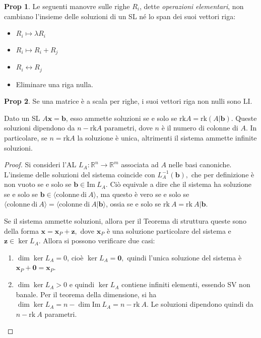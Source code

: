 \documentclass[]{article}
\newcommand{\bl}[1]{\mathbf{#1}}
\newcommand{\vb}{\mathbf{b}}
\theoremstyle{definition}
\theoremstyle{definition}
\newtheorem{prop}{Prop}[subsection]
\theoremstyle{definition}
\begin{document}
\begin{prop} Le seguenti manovre sulle righe $R_i$, dette \emph{operazioni elementari}, non cambiano l'insieme delle soluzioni di un SL né lo span dei suoi vettori riga:
\begin{itemize}
	\item $R_i \mapsto \lambda R_i $
	\item  $R_i \mapsto R_i + R_j $
	\item  $R_i \leftrightarrow R_j $
	\item  Eliminare una riga nulla.
\end{itemize}

\end{prop} \begin{prop} Se una matrice è a scala per righe, i suoi vettori riga non nulli sono LI.

\end{prop} 
\begin{thm} 
 Dato un SL $A \bl{x}= \bl{b}$, esso ammette soluzioni se e solo se $\mathrm{rk}A=\mathrm{rk}(A|\bl{b})$. Queste soluzioni dipendono da $n-\mathrm{rk}A$ parametri, dove $n$ è il numero di colonne di $A$. In particolare, se $n= \mathrm{rk} A$ la soluzione è unica, altrimenti il sistema ammette infinite soluzioni.
\end{thm}
\begin{proof}
Si consideri l'AL $L_A:\mathbb{R}^n \to \mathbb{R}^m$ associata ad $A$ nelle basi canoniche. L'insieme delle soluzioni del sistema coincide con $L_A^{-1}(\vb),$ che per definizione è non vuoto se e solo se $\vb \in \mathrm{Im}\ L_A.$ Ciò equivale a dire che il sistema ha soluzione se e solo se $\vb \in \langle \mathrm{colonne\ di\ } A \rangle$, ma questo è vero se e solo se $\langle \mathrm{colonne\ di\ } A \rangle= \langle \mathrm{colonne\ di\ } A|\vb \rangle$, ossia se e solo se $\mathrm{rk}\ A = \mathrm{rk}\ A|\vb.$

Se il sistema ammette soluzioni, allora per il Teorema di struttura queste sono della forma $\bl{x}=\bl{x}_P + \bl{z},$ dove $\bl{x}_P$ è una soluzione particolare del sistema e $\bl{z} \in \ker L_A.$ Allora si possono verificare due casi:
\begin{enumerate}
\item $\dim \ker L_A=0$, cioè $\ker L_A = \bl{0},$ quindi l'unica soluzione del sistema è $\bl{x}_P+\bl{0}=\bl{x}_P$.
\item $\dim \ker L_A>0$ e quindi $\ker L_A$ contiene infiniti elementi, essendo SV non banale. Per il teorema della dimensione, si ha $\dim \ker L_A=n- \dim \mathrm{Im}\ L_A = n- \mathrm{rk}\ A.$ Le soluzioni dipendono quindi da $n- \mathrm{rk}\ A$ parametri.
\end{enumerate}
\end{proof}
\end{document}
